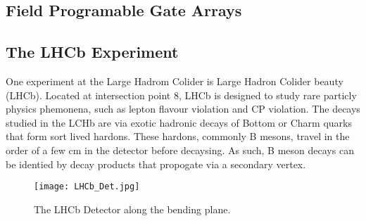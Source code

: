   \subsection{Field Programable Gate Arrays}

  \subsection{The LHCb Experiment}

    One experiment at the Large Hadrom Colider is Large Hadron Colider beauty (LHCb).
    Located at intersection point 8, LHCb is designed to study rare particly physics phemonena, such as lepton flavour violation and CP violation. 
    The decays studied in the LCHb are via exotic hadronic decays of Bottom or Charm quarks that form sort lived hardons. 
    These hardons, commonly B mesons, travel in the order of a few cm in the detector before decaysing. As such, B meson decays can be identied by decay products that propogate via a secondary vertex.

    \begin{figure}[h!]
      \centering
      \texttt{[image: LHCb\_Det.jpg]}
      \caption{The LHCb Detector along the bending plane.}
      \label{fig:LHCb_Collab}
    \end{figure}\FloatBarrier

